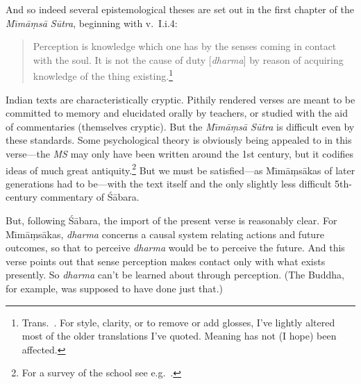 ﻿\documentclass[11pt]{amsart}
\begin{document}
And so indeed several epistemological theses are set out in the first chapter of the \emph{M\={\i}m\=a\d ms\=a S\=utra}, beginning with v.~I.i.4:\small \begin{quote}Perception is knowledge which one has by the senses coming in contact with the soul. It is not the cause of duty [\emph{dharma}] by reason of acquiring knowledge of the thing existing.\footnote{Trans.~\citet{jaimini1923mimamsa}. For style, clarity, or to remove or add glosses, I've lightly altered most of the older translations I've quoted. Meaning has not (I hope) been affected.}\end{quote}\normalsize Indian texts are characteristically cryptic. Pithily rendered verses are meant to be committed to memory and elucidated orally by teachers, or studied with the aid of commentaries (themselves cryptic). But the \emph{M\={\i}m\=a\d ms\=a S\=utra} is difficult even by these standards. Some psychological theory is obviously being appealed to in this verse---the \emph{MS} may only have been written around the 1st century, but it codifies ideas of much great antiquity.\footnote{For a survey of the school see e.g.~\citet{keith1921karma}.} But we must be satisfied---as M\={\i}m\=a\d ms\=akas of later generations had to be---with the text itself and the only slightly less difficult 5th-century commentary of \small\'S\normalsize \=abara.

But, following \small\'S\normalsize \=abara, the import of the present verse is reasonably clear. For M\={\i}m\=a\d ms\=akas, \emph{dharma} concerns a causal system relating actions and future outcomes, so that to perceive \emph{dharma} would be to perceive the future. And this verse points out that sense perception makes contact only with what exists presently. So \emph{dharma} can't be learned about through perception. (The Buddha, for example, was supposed to have done just that.)
\end{document}
